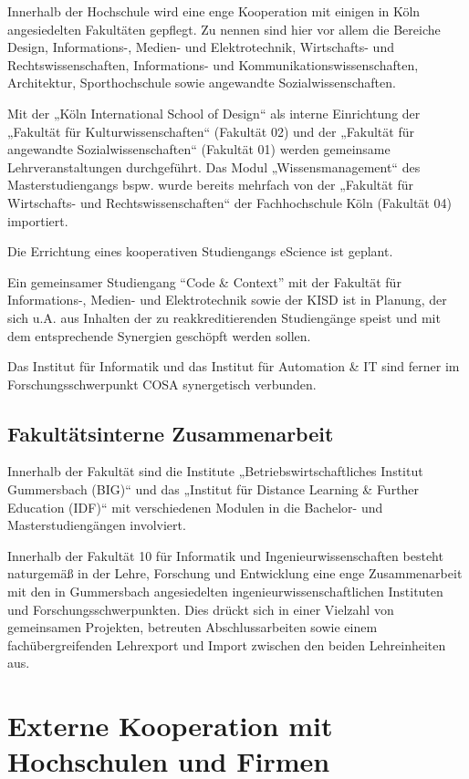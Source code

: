 Innerhalb der Hochschule wird eine enge Kooperation mit einigen in Köln
angesiedelten Fakultäten gepflegt. Zu nennen sind hier vor allem die
Bereiche Design, Informations-, Medien- und Elektrotechnik, Wirtschafts-
und Rechtswissenschaften, Informations- und
Kommunikationswissenschaften, Architektur, Sporthochschule sowie
angewandte Sozialwissenschaften.

Mit der „Köln International School of Design`` als interne Einrichtung
der „Fakultät für Kulturwissenschaften`` (Fakultät 02) und der „Fakultät
für angewandte Sozialwissenschaften`` (Fakultät 01) werden gemeinsame
Lehrveranstaltungen durchgeführt. Das Modul „Wissensmanagement`` des
Masterstudiengangs bspw. wurde bereits mehrfach von der „Fakultät für
Wirtschafts- und Rechtswissenschaften`` der Fachhochschule Köln
(Fakultät 04) importiert.

Die Errichtung eines kooperativen Studiengangs eScience ist geplant.

Ein gemeinsamer Studiengang ``Code \& Context'' mit der Fakultät für
Informations-, Medien- und Elektrotechnik sowie der KISD ist in Planung,
der sich u.A. aus Inhalten der zu reakkreditierenden Studiengänge speist
und mit dem entsprechende Synergien geschöpft werden sollen.

Das Institut für Informatik und das Institut für Automation \& IT sind
ferner im Forschungsschwerpunkt COSA synergetisch verbunden.

\subsection{Fakultätsinterne
Zusammenarbeit}\label{fakultuxe4tsinterne-zusammenarbeit}

Innerhalb der Fakultät sind die Institute „Betriebswirtschaftliches
Institut Gummersbach (BIG)`` und das „Institut für Distance Learning \&
Further Education (IDF)`` mit verschiedenen Modulen in die Bachelor- und
Masterstudiengängen involviert.

Innerhalb der Fakultät 10 für Informatik und Ingenieurwissenschaften
besteht naturgemäß in der Lehre, Forschung und Entwicklung eine enge
Zusammenarbeit mit den in Gummersbach angesiedelten
ingenieurwissenschaftlichen Instituten und Forschungsschwerpunkten. Dies
drückt sich in einer Vielzahl von gemeinsamen Projekten, betreuten
Abschlussarbeiten sowie einem fachübergreifenden Lehrexport und Import
zwischen den beiden Lehreinheiten aus.

\section{Externe Kooperation mit Hochschulen und
Firmen}\label{externe-kooperation-mit-hochschulen-und-firmen}

